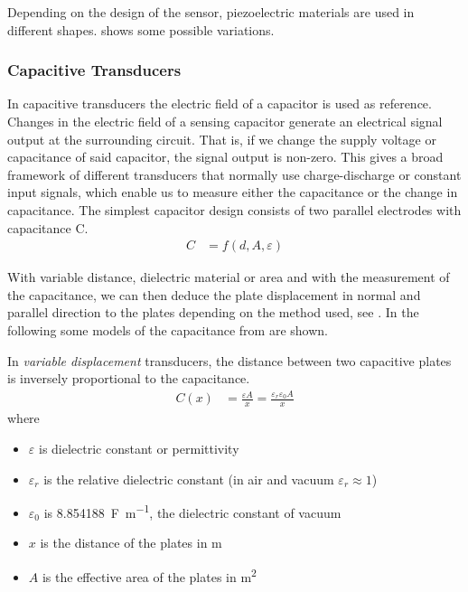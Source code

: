 Depending on the design of the sensor, piezoelectric materials are used in different shapes.  shows some possible variations.


\subsubsection{Capacitive Transducers}

In capacitive transducers the electric field of a capacitor is used as reference. Changes in the electric field of a sensing capacitor generate an electrical signal output at the surrounding circuit. That is, if we change the supply voltage or capacitance of said capacitor, the signal output is non-zero. This gives a broad framework of different transducers that normally use charge-discharge or constant input signals, which enable us to measure either the capacitance or the change in capacitance. The simplest capacitor design consists of two parallel electrodes with capacitance C.
\begin{align}
  C &= f(d,A,\varepsilon)
\end{align}

With variable distance, dielectric material or area and with the measurement of the capacitance, we can then deduce the plate displacement in normal and parallel direction to the plates depending on the method used, see . In the following some models of the capacitance from \cite{webster2018measurement} are shown.

In \emph{variable displacement} transducers, the distance between two capacitive plates is inversely proportional to the capacitance.
\begin{align}
  C(x) &= \frac{\varepsilon A}{x} = \frac{\varepsilon_r\varepsilon_0 A}{x}
\end{align}
where
\begin{itemize}
  \item $\varepsilon$ is dielectric constant or permittivity
  \item $\varepsilon_r$ is the relative dielectric constant (in air and vacuum $\varepsilon_r\approx 1$)
  \item $\varepsilon_0$ is \SI{8.854188}{\farad\per\meter}, the dielectric constant of vacuum
  \item $x$ is the distance of the plates in \si{\meter}
  \item $A$ is the effective area of the plates in \si{\meter\squared}
\end{itemize}

